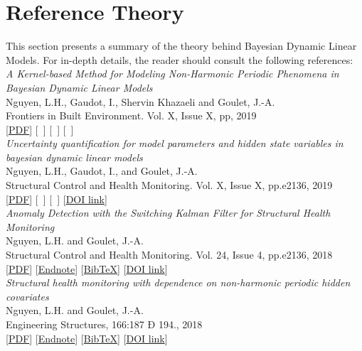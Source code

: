 \section{Reference Theory}
This section presents a summary of the theory behind Bayesian Dynamic Linear Models. For in-depth details, the reader should consult the following references:\\[4pt]

\noindent \emph{A Kernel-based Method for Modeling Non-Harmonic Periodic Phenomena in Bayesian Dynamic Linear Models}\\{\small
            Nguyen, L.H., Gaudot, I., Shervin Khazaeli and Goulet, J.-A.\\
            Frontiers in Built Environment. Vol. X, Issue X, pp, 2019\\}
      [\href{https://www.polymtl.ca/cgm/jagoulet/Site/Papers/Nguyen_et_al_KR_BDLM_2019.pdf}{PDF}] [~]  [~] [~] \cite{Nguyen2019KRBDLM}\\[4pt]

\noindent \emph{Uncertainty quantification for model parameters and hidden state variables in bayesian dynamic linear models}\\{\small
            Nguyen, L.H., Gaudot, I., and Goulet, J.-A.\\
            Structural Control and Health Monitoring. Vol. X, Issue X, pp.e2136, 2019\\}
      [\href{https://www.polymtl.ca/cgm/jagoulet/Site/Papers/Nguyen_Gaudot_Goulet_MCMC_BDLM_2018.pdf}{PDF}] [~]  [~] [\href{https://doi.org/10.1002/stc.2309}{DOI link}] \cite{Nguyen2018UncertaintyBDLM}\\[4pt]
      
      \noindent \emph{Anomaly Detection with the Switching Kalman Filter for Structural Health Monitoring}\\{\small
            Nguyen, L.H. and Goulet, J.-A.\\
            Structural Control and Health Monitoring. Vol. 24, Issue 4, pp.e2136, 2018\\}
      [\href{https://www.polymtl.ca/cgm/jagoulet/Site/Papers/2017_Nguyen_and_Goulet_AD-SKF.pdf}{PDF}] [\href{https://www.polymtl.ca/cgm/jagoulet/Site/Papers/Nguyen_SKF_2018.xml}{Endnote}]  [\href{https://www.polymtl.ca/cgm/jagoulet/Site/Papers/Nguyen_SKF_2018.ris}{BibTeX}] [\href{https://doi.org/10.1002/stc.2136}{DOI link}] \cite{Nguyen2018}\\[4pt]

\noindent \emph{Structural health monitoring with dependence on non-harmonic periodic hidden covariates}\\{\small
            Nguyen, L.H. and Goulet, J.-A.\\
            Engineering Structures, 166:187 Ð 194., 2018\\}
      [\href{https://www.polymtl.ca/cgm/jagoulet/Site/Papers/2018_Nguyen_et_Goulet_SHMHNHC.pdf}{PDF}] [\href{https://www.polymtl.ca/cgm/jagoulet/Site/Papers/2018_Nguyen_et_Goulet_HNHC.xml}{Endnote}]  [\href{https://www.polymtl.ca/cgm/jagoulet/Site/Papers/2018_Nguyen_et_Goulet_HNHC.bib}{BibTeX}] [\href{https://doi.org/10.1016/j.engstruct.2018.03.080}{DOI link}] \cite{Nguyen2018187}\\[4pt]

